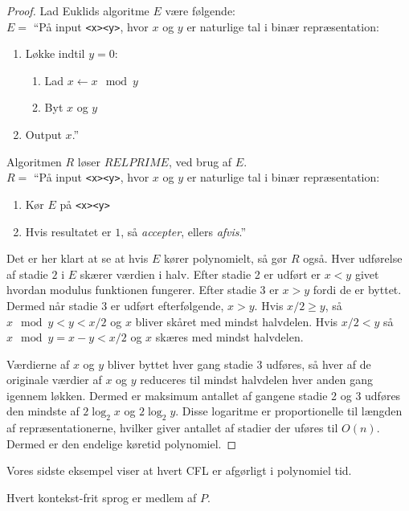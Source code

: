 \begin{proof}
	Lad Euklids algoritme $E$ være følgende: \\
	\noindent
	$E = $ ``På input \texttt{<x><y>}, hvor $x$ og $y$ er naturlige tal i binær repræsentation:
	\begin{enumerate}
		\item Løkke indtil $y = 0$:
		      \begin{enumerate}
			      \item Lad $x \leftarrow x \mod y$
			      \item Byt $x$ og $y$
		      \end{enumerate}
		\item Output $x$.''
	\end{enumerate}

	Algoritmen $R$ løser $RELPRIME$, ved brug af $E$.\\
	\noindent
	$R = $ ``På input \texttt{<x><y>}, hvor $x$ og $y$ er naturlige tal i binær repræsentation:
	\begin{enumerate}
		\item Kør $E$ på \texttt{<x><y>}
		\item Hvis resultatet er $1$, så \textit{accepter}, ellers \textit{afvis}.''
	\end{enumerate}

	Det er her klart at se at hvis $E$  kører polynomielt, så gør $R$ også. Hver udførelse af stadie $2$  i $E$ skærer værdien i halv. Efter stadie 2 er udført er $x < y$ givet hvordan modulus funktionen fungerer. Efter stadie $3$ er $x > y$ fordi de er byttet. Dermed når stadie 3 er udført efterfølgende, $x > y$. Hvis $x/2 \ge y$, så $x \mod y < y < x / 2$ og $x$ bliver skåret med mindst halvdelen. Hvis $x / 2 < y$ så $x \mod y = x - y < x / 2$ og $x$ skæres med mindst halvdelen.

	Værdierne af $x$ og $y$ bliver byttet hver gang stadie $3$ udføres, så hver af de originale værdier af $x$ og $y$ reduceres til mindst halvdelen hver anden gang igennem løkken. Dermed er maksimum antallet af gangene stadie 2 og 3 udføres den mindste af $2 \log_{2} x$ og $2 \log_{2} y$. Disse logaritme er proportionelle til længden af repræsentationerne, hvilker giver antallet af stadier der uføres til $O(n)$. Dermed er den endelige køretid polynomiel.
\end{proof}

Vores sidste eksempel viser at hvert CFL er afgørligt i polynomiel tid.

\begin{theorem}
	Hvert kontekst-frit sprog er medlem af $P$.
\end{theorem}

